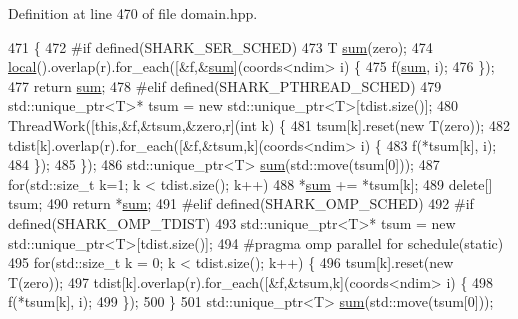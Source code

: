 Definition at line 470 of file domain.\+hpp.


\begin{DoxyCode}
471         \{
472 \textcolor{preprocessor}{#if defined(SHARK\_SER\_SCHED)}
473             T \hyperlink{classshark_1_1ndim_1_1_domain_a4acf8890a0637ff9987c4dea1f72bf79}{sum}(zero);
474             \hyperlink{classshark_1_1ndim_1_1_domain_a3351db56f9d6bd22ba473d744e3f7025}{local}().overlap(r).for\_each([&f,&\hyperlink{classshark_1_1ndim_1_1_domain_a4acf8890a0637ff9987c4dea1f72bf79}{sum}](coords<ndim> i) \{
475                 f(\hyperlink{classshark_1_1ndim_1_1_domain_a4acf8890a0637ff9987c4dea1f72bf79}{sum}, i);
476             \});
477             \textcolor{keywordflow}{return} \hyperlink{classshark_1_1ndim_1_1_domain_a4acf8890a0637ff9987c4dea1f72bf79}{sum};
478 \textcolor{preprocessor}{#elif defined(SHARK\_PTHREAD\_SCHED)}
479             std::unique\_ptr<T>* tsum = \textcolor{keyword}{new} std::unique\_ptr<T>[tdist.size()];
480             ThreadWork([\textcolor{keyword}{this},&f,&tsum,&zero,r](\textcolor{keywordtype}{int} k) \{
481                 tsum[k].reset(\textcolor{keyword}{new} T(zero));
482                 tdist[k].overlap(r).for\_each([&f,&tsum,k](coords<ndim> i) \{
483                     f(*tsum[k], i);
484                 \});
485             \});
486             std::unique\_ptr<T> \hyperlink{classshark_1_1ndim_1_1_domain_a4acf8890a0637ff9987c4dea1f72bf79}{sum}(std::move(tsum[0]));
487             \textcolor{keywordflow}{for}(std::size\_t k=1; k < tdist.size(); k++)
488                 *\hyperlink{classshark_1_1ndim_1_1_domain_a4acf8890a0637ff9987c4dea1f72bf79}{sum} += *tsum[k];
489             \textcolor{keyword}{delete}[] tsum;
490             \textcolor{keywordflow}{return} *\hyperlink{classshark_1_1ndim_1_1_domain_a4acf8890a0637ff9987c4dea1f72bf79}{sum};
491 \textcolor{preprocessor}{#elif defined(SHARK\_OMP\_SCHED)}
492 \textcolor{preprocessor}{#if defined(SHARK\_OMP\_TDIST)}
493             std::unique\_ptr<T>* tsum = \textcolor{keyword}{new} std::unique\_ptr<T>[tdist.size()];
494 \textcolor{preprocessor}{#pragma omp parallel for schedule(static)}
495             \textcolor{keywordflow}{for}(std::size\_t k = 0; k < tdist.size(); k++) \{
496                 tsum[k].reset(\textcolor{keyword}{new} T(zero));
497                 tdist[k].overlap(r).for\_each([&f,&tsum,k](coords<ndim> i) \{
498                     f(*tsum[k], i);
499                 \});
500             \}
501             std::unique\_ptr<T> \hyperlink{classshark_1_1ndim_1_1_domain_a4acf8890a0637ff9987c4dea1f72bf79}{sum}(std::move(tsum[0]));

\end{DoxyCode}
